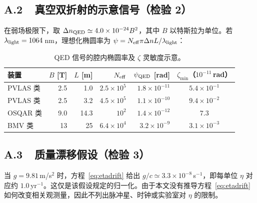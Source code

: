 \documentclass[UTF8,fontset=none,11pt,a4paper]{ctexart}
\begin{document}
\subsection*{A.2\ \ 真空双折射的示意信号（检验 2）}

在弱场极限下，取 $\Delta n_{\rm QED}\simeq4.0\times10^{-24}B^2$，其中 $B$ 以特斯拉为单位。若 $\lambda_{\rm light}=1064\,$nm，理想化椭圆率为
$\psi=N_{\rm eff}\pi\Delta nL/\lambda_{\rm light}$：

\begin{table}[htbp]
\centering\small
\caption{QED 信号的腔内椭圆率及 $\zeta$ 灵敏度示意。}
\begin{tabular}{@{}lrrrrc@{}}
\toprule
装置 & $B$ [T] & $L$ [m] & $N_{\rm eff}$ & $\psi_{\rm QED}$ [rad] & $\zeta_{\min}$（$10^{-11}\,$rad）\\
\midrule
PVLAS 类 & 2.5 & 1.0 & $2.5\times10^{5}$ & $1.8\times10^{-11}$ & $5.4\times10^{-1}$ \\
PVLAS 类 & 2.5 & 3.2 & $4.5\times10^{5}$ & $1.1\times10^{-10}$ & $9.4\times10^{-2}$ \\
OSQAR 类 & 9.0 & 14.3 & $10^{2}$ & $1.4\times10^{-12}$ & $7.3$ \\
BMV 类   & 13  & 25 & $6.4\times10^{4}$ & $3.2\times10^{-9}$ & $3.1\times10^{-3}$ \\
\bottomrule
\end{tabular}
\end{table}

\subsection*{A.3\ \ 质量漂移假设（检验 3）}

当 $g=9.81\,$m/s$^2$ 时，方程~\eqref{eq:etadrift} 给出 $g/c\simeq3.3\times10^{-8}\,$s$^{-1}$，即每单位 $\eta$ 对应约 $1.0\,$yr$^{-1}$。这仅是该假设规定的归一化。由于本文没有推导方程~\eqref{eq:etadrift} 如何改变相关观测量，因此不列出脉冲星、时钟或实验室对 $\eta$ 的限制。
\end{document}
